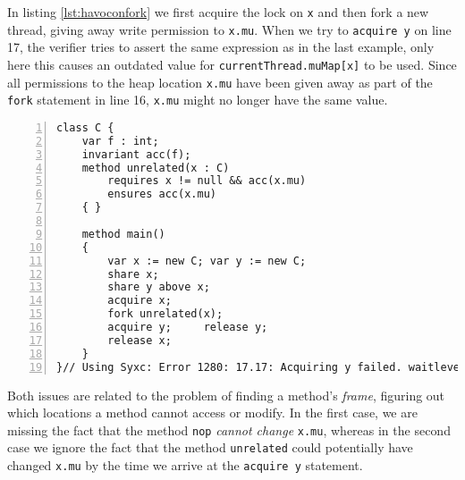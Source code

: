 In listing \ref{lst:havoconfork} we first acquire the lock on \lstinline!x! and then fork a new thread, giving away write permission to \lstinline!x.mu!.
When we try to \lstinline!acquire y! on line 17, the verifier tries to assert the same expression as in the last example, only here this causes an outdated value for \lstinline!currentThread.muMap[x]! to be used. 
Since all permissions to the heap location \lstinline!x.mu! have been given away as part of the \lstinline[language=Chalice]!fork! statement in line 16, \lstinline!x.mu! might no longer have the same value.

\begin{lstlisting}[float,caption={Keeping too much information about \lstinline!mu!.},label=lst:havoconfork,language=chalice,numbers=left]
class C {
    var f : int;
    invariant acc(f);
    method unrelated(x : C)
        requires x != null && acc(x.mu)
        ensures acc(x.mu)
    { }

    method main()
    {
        var x := new C; var y := new C;
        share x;
        share y above x;
        acquire x;
        fork unrelated(x);
        acquire y;     release y;
        release x;
    }
}// Using Syxc: Error 1280: 17.17: Acquiring y failed. waitlevel << mu might not hold.
\end{lstlisting}

Both issues are related to the problem of finding a method's \emph{frame}, figuring out which locations a method cannot access or modify.
In the first case, we are missing the fact that the method \lstinline!nop! \emph{cannot change} \lstinline!x.mu!, whereas in the second case we ignore the fact that the method \lstinline!unrelated! could potentially have changed \lstinline!x.mu! by the time we arrive at the \lstinline[language=Chalice]!acquire y! statement.
